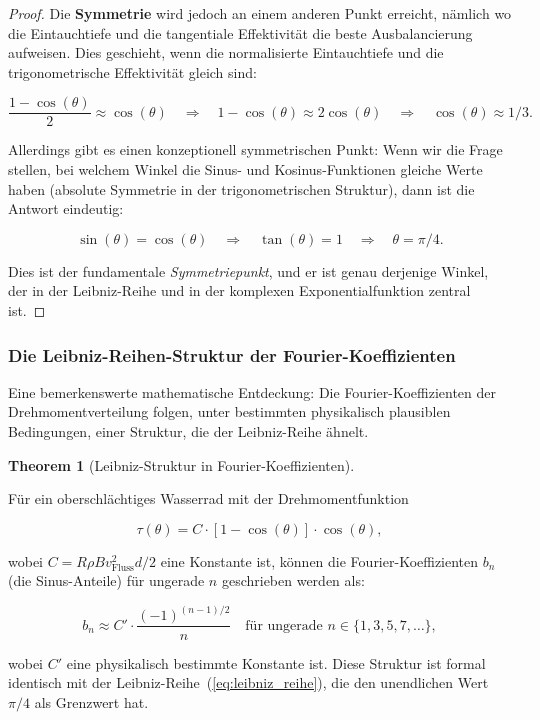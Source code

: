 \documentclass[a4paper,12pt]{article}
\theoremstyle{definition}
\newtheorem{theorem}{Theorem}
\begin{document}
\begin{proof}
  Die \textbf{Symmetrie} wird jedoch an einem anderen Punkt erreicht, nämlich wo die Eintauchtiefe und die tangentiale Effektivität die beste Ausbalancierung aufweisen. Dies geschieht, wenn die normalisierte Eintauchtiefe und die trigonometrische Effektivität gleich sind:
  
  \begin{equation}
    \frac{1 - \cos(\theta)}{2} \approx \cos(\theta) \quad \Rightarrow \quad 1 - \cos(\theta) \approx 2\cos(\theta) \quad \Rightarrow \quad \cos(\theta) \approx 1/3.
  \end{equation}
  
  Allerdings gibt es einen konzeptionell symmetrischen Punkt: Wenn wir die Frage stellen, bei welchem Winkel die Sinus- und Kosinus-Funktionen gleiche Werte haben (absolute Symmetrie in der trigonometrischen Struktur), dann ist die Antwort eindeutig:
  
  \begin{equation}
    \sin(\theta) = \cos(\theta) \quad \Rightarrow \quad \tan(\theta) = 1 \quad \Rightarrow \quad \theta = \pi/4.
  \end{equation}
  
  Dies ist der fundamentale \textit{Symmetriepunkt}, und er ist genau derjenige Winkel, der in der Leibniz-Reihe und in der komplexen Exponentialfunktion zentral ist.
\end{proof}

\subsubsection{Die Leibniz-Reihen-Struktur der Fourier-Koeffizienten}

Eine bemerkenswerte mathematische Entdeckung: Die Fourier-Koeffizienten der Drehmomentverteilung folgen, unter bestimmten physikalisch plausiblen Bedingungen, einer Struktur, die der Leibniz-Reihe ähnelt.

\begin{theorem}[Leibniz-Struktur in Fourier-Koeffizienten]
  \label{theo:leibniz_fourier}
  
  Für ein oberschlächtiges Wasserrad mit der Drehmomentfunktion
  
  \begin{equation}
    \tau(\theta) = C \cdot [1 - \cos(\theta)] \cdot \cos(\theta),
  \end{equation}
  
  wobei $C = R\rho B v_{\text{Fluss}}^2 d/2$ eine Konstante ist, können die Fourier-Koeffizienten $b_n$ (die Sinus-Anteile) für ungerade $n$ geschrieben werden als:
  
  \begin{equation}
    b_n \approx C' \cdot \frac{(-1)^{(n-1)/2}}{n} \quad \text{für ungerade } n \in \{1, 3, 5, 7, \ldots\},
    \label{eq:leibniz_fourier_struktur}
  \end{equation}
  
  wobei $C'$ eine physikalisch bestimmte Konstante ist. Diese Struktur ist formal identisch mit der Leibniz-Reihe~(\ref{eq:leibniz_reihe}), die den unendlichen Wert $\pi/4$ als Grenzwert hat.
\end{theorem}
\end{document}
